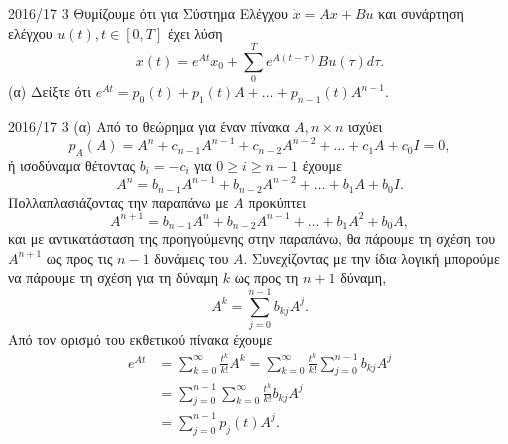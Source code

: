 \documentclass[a4paper,11pt]{article}
\begin{document}
\begin{exercise}{2016/17 3}
    Θυμίζουμε ότι για Σύστημα Ελέγχου \( \dot{x} = Ax + Bu \) και συνάρτηση
    ελέγχου \( u(t), t \in [0, T] \) έχει λύση
    \begin{equation*}
        x(t) = e^{At}x_0 + \sum_0^T e^{A(t - \tau)}Bu(\tau) d\tau.
    \end{equation*}
    (α) Δείξτε ότι \( e^{At} = p_0(t) + p_1(t)A + \dots + p_{n-1}(t)A^{n-1}\).
\end{exercise}
\begin{solution}{2016/17 3}
    (α) Από το θεώρημα  για έναν πίνακα \( A, n\times n \) ισχύει
    \begin{equation*}
        p_A(A) = A^n + c_{n-1}A^{n-1} + c_{n-2}A^{n-2} + \dots +  c_1A + c_0I = 0,
    \end{equation*}
    ή ισοδύναμα θέτοντας \( b_i = -c_i \) για \( 0 \geq i \geq n-1 \) έχουμε
    \begin{equation*}
        A^n = b_{n-1}A^{n-1} + b_{n-2}A^{n-2} + \dots + b_1A + b_0I.
    \end{equation*}
    Πολλαπλασιάζοντας την παραπάνω με \( A \) προκύπτει
    \begin{equation*}
        A^{n+1} = b_{n-1}A^{n} + b_{n-2}A^{n-1} + \dots + b_1A^2 + b_0A,
    \end{equation*}
    και με αντικατάσταση της προηγούμενης στην παραπάνω, θα πάρουμε τη σχέση του
    \( A^{n+1} \) ως προς τις \( n-1 \) δυνάμεις του \( A \). Συνεχίζοντας με
    την ίδια λογική μπορούμε να πάρουμε τη σχέση για τη δύναμη
    \( k \) ως προς τη \( n+1 \) δύναμη,
    \begin{equation*}
        A^k = \sum_{j=0}^{n-1}b_{kj}A^j.
    \end{equation*}
    Από τον ορισμό του εκθετικού πίνακα έχουμε
    \begin{align*}
        e^{At} &= \sum_{k=0}^{\infty}\frac{t^k}{k!}A^k
        = \sum_{k=0}^{\infty}\frac{t^k}{k!} \sum_{j=0}^{n-1}b_{kj}A^j \\
        &= \sum_{j=0}^{n-1} \sum_{k=0}^{\infty}\frac{t^k}{k!}b_{kj}A^j \\
        &= \sum_{j=0}^{n-1} p_j(t)A^j.
    \end{align*}
\end{solution}

\newpage
{}
\printbibliography[title=\greektext{Βιβλιογραφία}]
\end{document}
